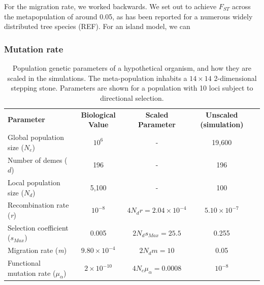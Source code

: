 \documentclass[11pt,twoside,lineno]{GSA_format}
\begin{document}
For the migration rate, we worked backwards. We set out to achieve $F_{ST}$ across the metapopulation of around 0.05, as has been reported for a numerous widely distributed tree species (REF). For an island model, we can 

\subsubsection{Mutation rate} 


\begin{table}[]
\label{SimulationParameters}
\caption{Population genetic parameters of a hypothetical organism, and how they are scaled in the simulations. The meta-population inhabits a $14\times14$ 2-dimensional stepping stone. Parameters are shown for a population with 10 loci subject to directional selection.}
\begin{tabular}{lcccl}
\cline{1-4}
\textbf{Parameter} & \textbf{Biological Value} & \textbf{Scaled Parameter}        & \textbf{Unscaled (simulation)} \\ \cline{1-4}
Global population size ($N_e$)                 & $10^6$                                      & -                           & 19,600                                              &           \\
Number of demes ($d$)                  & 196                                      & -                           & 196                                                &           \\
Local population size ($N_d$)                  & 5,100                                      & -                           & 100                                                &           \\
Recombination rate (\textit{r})                        & $10^{-8}$                                      & $4N_dr = 2.04 \times 10^{-4}$ & $5.10 \times 10^{-7}$                                           &           \\
Selection coefficient (\textit{$s_{Max}$})                        & 0.005                                         & $2N_ds_{Max}= 25.5$ & 0.255                                           &           \\
Migration rate (\textit{m})                        & $9.80\times 10^{-4}$                                      & $2N_dm = 10$        & 0.05                                               &           \\
Functional mutation rate (\textit{$\mu_\alpha$})                        & $2\times 10^{-10}$                                      & $4N_e\mu_\alpha = 0.0008$        & $10^{-8}$ &           \\ \cline{1-4}
\end{tabular}
\end{table}
\end{document}
